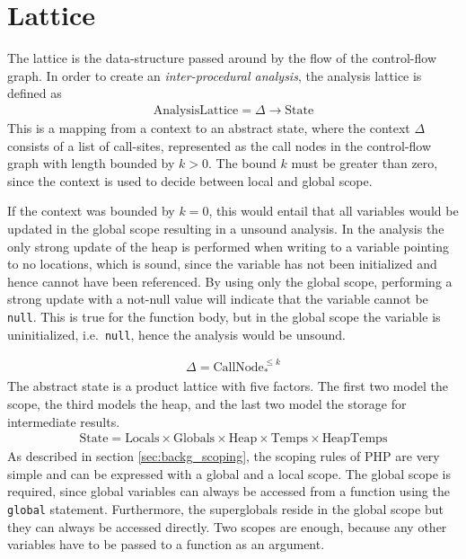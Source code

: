 \section{Lattice}
\label{sec:lattice}

The lattice is the data-structure passed around by the flow of the control-flow graph. In order to create an \emph{inter-procedural analysis}, the analysis lattice is defined as
\begin{align}
\text{AnalysisLattice} = \Delta \rightarrow \text{State}
\end{align}
This is a mapping from a context to an abstract state, where the context $\Delta$ consists of a list of call-sites, represented as the call nodes in the control-flow graph with length bounded by $k>0$. The bound $k$ must be greater than zero, since the context is used to decide between local and global scope. 

If the context was bounded by $k=0$, this would entail that all variables would be updated in the global scope resulting in a unsound analysis. In the analysis the only strong update of the heap is performed when writing to a variable pointing to no locations, which is sound, since the variable has not been initialized and hence cannot have been referenced. By using only the global scope, performing a strong update with a not-null value will indicate that the variable cannot be \texttt{null}. This is true for the function body, but in the global scope the variable is uninitialized, i.e.\ \texttt{null}, hence the analysis would be unsound.

\begin{align}
\Delta = \text{CallNode}_*^{\leq k}
\end{align}
The abstract state is a product lattice with five factors. The first two model the scope, the third models the heap, and the last two model the storage for intermediate results. 
\begin{align}
\text{State} = \text{Locals} \times \text{Globals} \times \text{Heap} \times \text{Temps} \times \text{HeapTemps} 
\end{align}
As described in section \ref{sec:backg_scoping}, the scoping rules of PHP are very simple and can be expressed with a global and a local scope. The global scope is required, since global variables can always be accessed from a function using the \texttt{global} statement. Furthermore, the superglobals reside in the global scope but they can always be accessed directly. Two scopes are enough, because any other variables have to be passed to a function as an argument.

